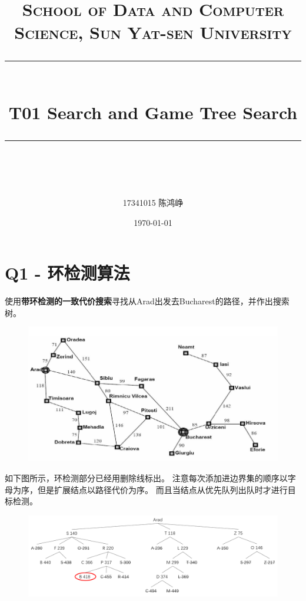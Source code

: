 \documentclass[a4paper, 11pt]{article}
\title{	
\normalfont \normalsize
\textsc{School of Data and Computer Science, Sun Yat-sen University} \\ [25pt] %
\rule{\textwidth}{0.5pt} \\[0.4cm] %
\huge  T01 Search and Game Tree Search\\ %
\rule{\textwidth}{2pt} \\[0.5cm] %
\author{17341015 陈鸿峥}
\date{\normalsize\today}
}
\begin{document}
\maketitle
\tableofcontents
\newpage

\section{Q1 - 环检测算法}
\begin{question}
使用\textbf{带环检测的一致代价搜索}寻找从Arad出发去Bucharest的路径，并作出搜索树。
\begin{figure}[H]
\centering
\includegraphics[width=0.8\linewidth]{fig/map.png}
\end{figure}
\end{question}
\begin{answer}
如下图所示，环检测部分已经用删除线标出。
注意每次添加进边界集的顺序以字母为序，但是扩展结点以路径代价为序。
而且当结点从优先队列出队时才进行目标检测。
\begin{figure}[H]
\centering
\includegraphics[width=\linewidth]{fig/A1.png}
\end{figure}
\end{answer}
\end{document}
